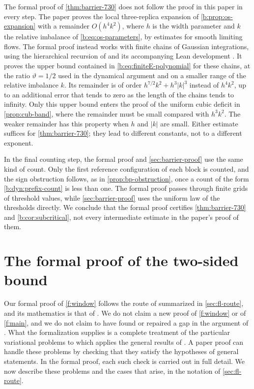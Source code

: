The formal proof of \cref{thm:barrier-730} does not follow the proof in this paper in every step. The paper proves the local three-replica expansion of \cref{b:prop:os-expansion} with a remainder $O(h^4k^2)$, where $h$ is the width parameter and $k$ the relative imbalance of \eqref{b:eq:os-parameters}, by estimates for smooth limiting flows. The formal proof instead works with finite chains of Gaussian integrations, using the hierarchical recursion of \cite[Section~2]{oai-barriers} and its accompanying Lean development \cite{oai-math-lean}. It proves the upper bound contained in \eqref{b:eq:finiteE-polynomial} for these chains, at the ratio $\vartheta=1/2$ used in the dynamical argument and on a smaller range of the relative imbalance $k$. Its remainder is of order $h^{7/2}k^2+h^3|k|^3$ instead of $h^4k^2$, up to an additional error that tends to zero as the length of the chains tends to infinity. Only this upper bound enters the proof of the uniform cubic deficit in \cref{prop:cub-band}, where the remainder must be small compared with $h^3k^2$. The weaker remainder has this property when $h$ and $|k|$ are small. Either estimate suffices for \cref{thm:barrier-730}; they lead to different constants, not to a different exponent.

In the final counting step, the formal proof and \cref{sec:barrier-proof} use the same kind of count. Only the first reference configuration of each block is counted, and the sign obstruction follows, as in \cref{prop:bp-obstruction}, once a count of the form \eqref{b:dyn:prefix-count} is less than one. The formal proof passes through finite grids of threshold values, while \cref{sec:barrier-proof} uses the uniform law of the thresholds directly. We conclude that the formal proof certifies \cref{thm:barrier-730} and \cref{b:cor:subcritical}, not every intermediate estimate in the paper's proof of them.

\section{The formal proof of the two-sided bound}\label{sec:formal-window}

Our formal proof of \cref{f:window} follows the route of \cite{oai-fluctuations} summarized in \cref{sec:fl-route}, and its mathematics is that of \cite{oai-fluctuations}. We do not claim a new proof of \cref{f:window} or of \cref{f:main}, and we do not claim to have found or repaired a gap in the argument of \cite{oai-fluctuations}. What the formalization supplies is a complete treatment of the particular variational problems to which \cite[Section~7]{oai-fluctuations} applies the general results of \cite[Sections~3--6]{oai-fluctuations}. A paper proof can handle these problems by checking that they satisfy the hypotheses of general statements. In the formal proof, each such check is carried out in full detail. We now describe these problems and the cases that arise, in the notation of \cref{sec:fl-route}.

